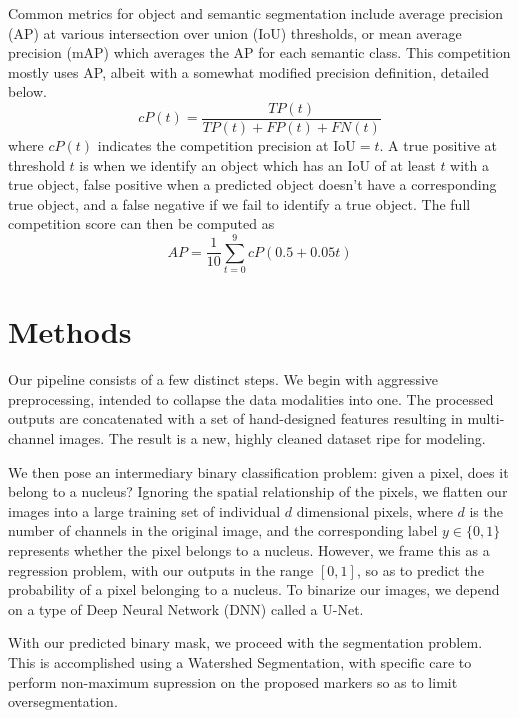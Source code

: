 \documentclass[paper=letter, fontsize=12pt]{article}
\numberwithin{equation}{section} %
\numberwithin{figure}{section} %
\numberwithin{table}{section} %
\begin{document}
Common metrics for object and semantic segmentation include average precision
(AP) at various intersection over union (IoU) thresholds, or mean average
precision (mAP) which averages the AP for each semantic class.  This
competition mostly uses AP, albeit with a somewhat modified precision
definition, detailed below.
\begin{equation}
    cP(t) = \frac{TP(t)}{TP(t) + FP(t) + FN(t)}
\end{equation}
where $cP(t)$ indicates the competition precision at $\text{IoU}=t$.  A true
positive at threshold $t$ is when we identify an object which has an IoU of at
least $t$ with a true object, false positive when a predicted object doesn't
have a corresponding true object, and a false negative if we fail to identify a
true object.  The full competition score can then be computed as
\begin{equation}
    AP = \frac{1}{10}\sum_{t = 0}^{9} cP(0.5 + 0.05t)
\end{equation}

\section{Methods}

Our pipeline consists of a few distinct steps.  We begin with aggressive
preprocessing, intended to collapse the data modalities into one.  The
processed outputs are concatenated with a set of hand-designed features
resulting in multi-channel images.  The result is a new, highly cleaned dataset
ripe for modeling.

We then pose an intermediary binary classification problem: given a pixel, does
it belong to a nucleus?  Ignoring the spatial relationship of the pixels, we
flatten our images into a large training set of individual $d$ dimensional
pixels, where $d$ is the number of channels in the original image, and the
corresponding label $y \in \{0, 1\}$ represents whether the pixel belongs to a
nucleus.  However, we frame this as a regression problem, with our outputs in
the range $[0, 1]$, so as to predict the probability of a pixel belonging to a
nucleus.  To binarize our images, we depend on a type of Deep Neural Network
(DNN) called a U-Net.

With our predicted binary mask, we proceed with the segmentation problem.  This
is accomplished using a Watershed Segmentation, with specific care to perform
non-maximum supression on the proposed markers so as to limit oversegmentation.
\end{document}
